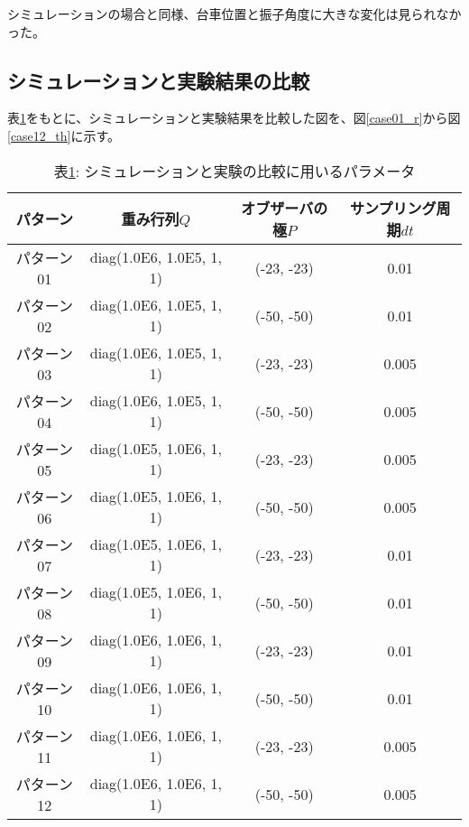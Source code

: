 シミュレーションの場合と同様、台車位置と振子角度に大きな変化は見られなかった。


\subsection{シミュレーションと実験結果の比較}
表\ref{sim_exp}をもとに、シミュレーションと実験結果を比較した図を、図\ref{case01_r}から図\ref{case12_th}に示す。

\begin{table}[htbp]
	\begin{center}
    \caption{表\ref{sim_exp}: シミュレーションと実験の比較に用いるパラメータ}
		\begin{tabular}{|c|c|c|c|} \hline
			パターン & 重み行列$Q$ & オブザーバの極$P$ & サンプリング周期$dt$ \\ \hline\hline
			パターン01 & diag(1.0E6, 1.0E5, 1, 1) & (-23, -23) & 0.01  \\ \hline
			パターン02 & diag(1.0E6, 1.0E5, 1, 1) & (-50, -50) & 0.01  \\ \hline
			パターン03 & diag(1.0E6, 1.0E5, 1, 1) & (-23, -23) & 0.005 \\ \hline
			パターン04 & diag(1.0E6, 1.0E5, 1, 1) & (-50, -50) & 0.005 \\ \hline
			パターン05 & diag(1.0E5, 1.0E6, 1, 1) & (-23, -23) & 0.005 \\ \hline
			パターン06 & diag(1.0E5, 1.0E6, 1, 1) & (-50, -50) & 0.005 \\ \hline
			パターン07 & diag(1.0E5, 1.0E6, 1, 1) & (-23, -23) & 0.01  \\ \hline
			パターン08 & diag(1.0E5, 1.0E6, 1, 1) & (-50, -50) & 0.01  \\ \hline
			パターン09 & diag(1.0E6, 1.0E6, 1, 1) & (-23, -23) & 0.01  \\ \hline
			パターン10 & diag(1.0E6, 1.0E6, 1, 1) & (-50, -50) & 0.01  \\ \hline
			パターン11 & diag(1.0E6, 1.0E6, 1, 1) & (-23, -23) & 0.005 \\ \hline
			パターン12 & diag(1.0E6, 1.0E6, 1, 1) & (-50, -50) & 0.005 \\ \hline
		\end{tabular}
		\label{sim_exp}
	\end{center}
\end{table}

